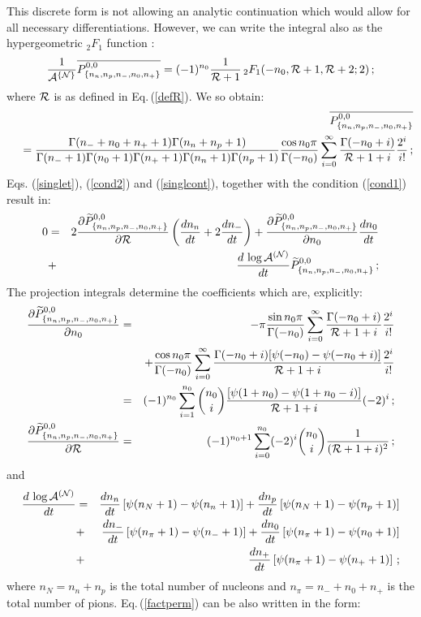 \documentclass[a4paper,11pt]{article}
\begin{document}
This discrete form is not allowing an analytic continuation which
would allow for all necessary differentiations. However, we can
write the integral also as the hypergeometric ${}_2F_1$ function
\cite{Abram}:
\begin{equation} \label{hGauss}
\frac{1}{{\cal A}^{\{{\cal
N}\}}}\overline{P^{0,0}_{\{n_n,n_p,n_{-},n_0,n_{+}\}}} =
(-1)^{n_0}\frac{1}{{\cal R}+1} \, {}_2F_1(-n_0,{\cal R}+1,{\cal
R}+2;2)\,;
\end{equation}
where ${\cal R}$ is as defined in Eq.\,(\ref{defR}). We so obtain:
\begin{eqnarray} \label{singlcont}
&&\overline{P^{0,0}_{\{n_n,n_p,n_{-},n_0,n_{+}\}}}\nonumber\\
&&\;=\frac{\Gamma(n_{-}+n_0+n_{+}+1)
\Gamma(n_n+n_p+1)}{\Gamma(n_{-}+1)\Gamma(n_0+1)
\Gamma(n_{+}+1)\Gamma(n_n+1)\Gamma(n_p+1)} \frac{\cos
n_0\pi}{\Gamma(-n_0)}\sum_{i=0}^\infty\frac{\Gamma(-n_0+i)} {{\cal
R}+1+i}\frac{2^i}{i!}\,;
\end{eqnarray}
Eqs. (\ref{singlet}), (\ref{cond2}) and (\ref{singlcont}),
together with the condition (\ref{cond1})  result in:
\begin{eqnarray}\label{cond3}
0&=&2\frac{\partial \widetilde
P^{0,0}_{\{n_n,n_p,n_{-},n_0,n_{+}\}}}{\partial{\cal R}}
\left(\frac{d n_n}{dt} + 2\frac{d n_{-}}{dt}\right)+
\frac{\partial\widetilde
P^{0,0}_{\{n_n,n_p,n_{-},n_0,n_{+}\}}}{\partial n_0} \frac{d
n_0}{dt}\nonumber\\ &+&\frac{d\,\log{\cal A}^{({\cal
N})}}{dt}\widetilde P^{0,0}_{\{n_n,n_p,n_{-},n_0,n_{+}\}} \,;
\end{eqnarray}
The projection  integrals determine the coefficients which are,
explicitly:
\begin{eqnarray}
\frac{\partial \widetilde
P^{0,0}_{\{n_n,n_p,n_{-},n_0,n_{+}\}}}{\partial n_0}&=&
-\pi\frac{\sin
n_0\pi}{\Gamma(-n_0)}\sum_{i=0}^\infty\frac{\Gamma(-n_0+i)} {{\cal
R}+1+i}\frac{2^i}{i!} \nonumber\\& &+ \frac{\cos
n_0\pi}{\Gamma(-n_0)}\sum_{i=0}^\infty\frac{\Gamma(-n_0+i)
[\psi(-n_0)-\psi(-n_0+i)]}{{\cal R}+1+i}\frac{2^i}{i!}\\ &=&
(-1)^{n_0}\sum_{i=1}^{n_0}{n_0\choose i} \frac{
[\psi(1+n_0)-\psi(1+n_0-i)]}{{\cal R}+1+i}(-2)^i\,;\nonumber
\\
\frac{\partial\widetilde
P^{0,0}_{\{n_n,n_p,n_{-},n_0,n_{+}\}}}{\partial{\cal R}} &=&
(-1)^{n_0+1}\sum_{i=0}^{n_0}(-2)^i {n_0\choose i}\frac{1}{({\cal
R}+1+i)^2}\,;
\end{eqnarray}
and
\begin{eqnarray}\label{factperm}
\frac{d\,\log{\cal A}^{({\cal N})}}{dt}
&=&\frac{dn_n}{dt}\left[\psi(n_N+1)-\psi(n_n+1)\right]
+\frac{dn_p}{dt}\left[\psi(n_N+1)-\psi(n_p+1)\right]\nonumber\\
&+&\frac{dn_{-}}{dt}\left[\psi(n_\pi+1)-\psi(n_{-}+1)\right]+
\frac{dn_0}{dt}\left[\psi(n_\pi+1)-\psi(n_0+1)\right]\nonumber\\
&+&\frac{dn_{+}}{dt}\left[\psi(n_\pi+1)-\psi(n_{+}+1)\right]\,;
\end{eqnarray}
where $n_N=n_n+n_p$ is the total number of nucleons and
$n_\pi=n_{-}+n_0+n_{+}$ is the total number of pions.
Eq.\,(\ref{factperm}) can be also written in the form:
\end{document}
